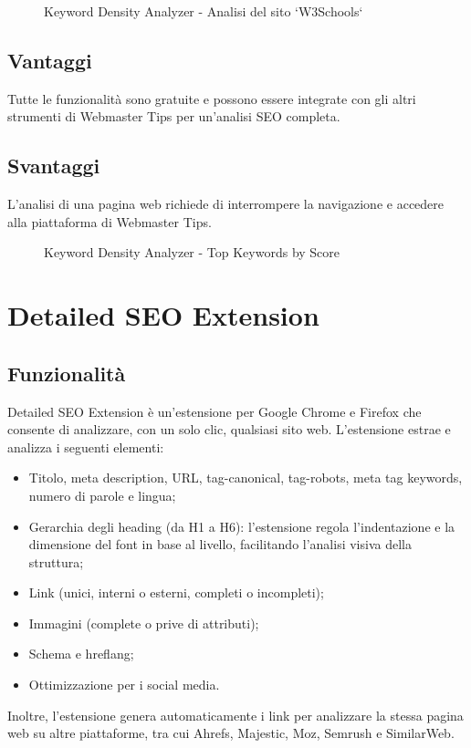 \begin{figure}[H]
    \centering 
    \caption{Keyword Density Analyzer - Analisi del sito `W3Schools`}
\end{figure}

\subsection{Vantaggi}
\par Tutte le funzionalità sono gratuite e possono essere integrate con gli altri strumenti di Webmaster Tips per un'analisi SEO completa.

\subsection{Svantaggi}
\par L'analisi di una pagina web richiede di interrompere la navigazione e accedere alla piattaforma di Webmaster Tips.

\begin{figure}[H]
    \centering 
    \caption{Keyword Density Analyzer - Top Keywords by Score}
\end{figure}

\section{Detailed SEO Extension}

\subsection{Funzionalità}
\par Detailed SEO Extension è un'estensione per Google Chrome e Firefox che consente di analizzare, con un solo clic, qualsiasi sito web. L'estensione estrae e analizza i seguenti elementi:
\begin{itemize}
    \item Titolo, meta description, URL, \gls{tag-canonical}, \gls{tag-robots}, meta tag keywords, numero di parole e lingua;
    \item Gerarchia degli heading (da H1 a H6): l'estensione regola l'indentazione e la dimensione del font in base al livello, facilitando l'analisi visiva della struttura;
    \item Link (unici, interni o esterni, completi o incompleti);
    \item Immagini (complete o prive di attributi);
    \item Schema e \gls{hreflang};
    \item Ottimizzazione per i social media.
\end{itemize}
Inoltre, l'estensione genera automaticamente i link per analizzare la stessa pagina web su altre piattaforme, tra cui Ahrefs, Majestic, Moz, Semrush e SimilarWeb.

